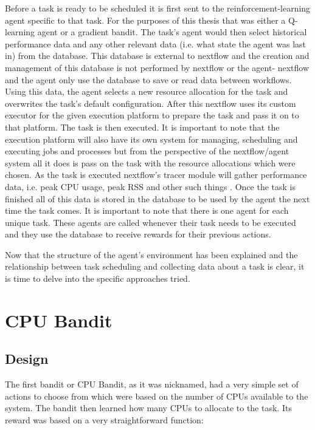 Before a task is ready to be scheduled it is first sent to the reinforcement-learning agent specific to that task. For the purposes of this thesis that was either a Q-learning agent or a gradient bandit. The task’s agent would then select historical performance data and any other relevant data (i.e. what state the agent was last in) from the database. This database is external to nextflow and the creation and management of this database is not performed by nextflow or the agent- nextflow and the agent only use the database to save or read data between workflows. Using this data, the agent selects a new resource allocation for the task and overwrites the task’s default configuration. After this nextflow uses its custom executor for the given execution platform to prepare the task and pass it on to that platform. The task is then executed. It is important to note that the execution platform will also have its own system for managing, scheduling and executing jobs and processes but from the perspective of the nextflow/agent system all it does is pass on the task with the resource allocations which were chosen. As the task is executed nextflow’s tracer module will gather performance data, i.e. peak CPU usage, peak RSS and other such things \cite{TracingAndVisualisation}. Once the task is finished all of this data is stored in the  database to be used by the agent the next time the task comes. It is important to note that there is one agent for each unique task. These agents are called whenever their task needs to be executed and they use the database to receive rewards for their previous actions.


Now that the structure of the agent’s environment has been explained and the relationship between task scheduling and collecting data about a task is clear, it is time to delve into the specific approaches tried.

\section{CPU Bandit}
\label{sec:cpu_bandit}

\subsection{Design}
\label{sub:bandit1_design}

The first bandit or CPU Bandit, as it was nicknamed, had a very simple set of actions to choose from which were based on the number of CPUs available to the system. The bandit then learned how many CPUs to allocate to the task. Its reward was based on a very straightforward function:

